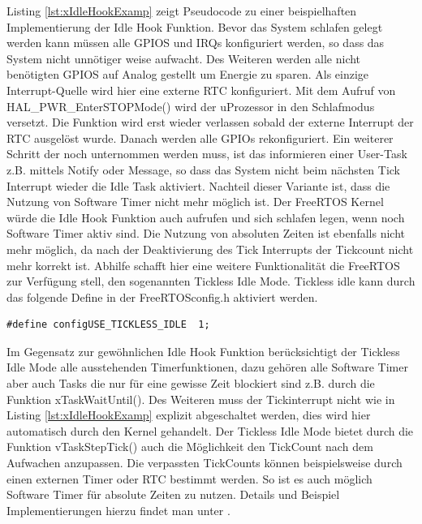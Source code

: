 Listing \ref{lst:xIdleHookExamp} zeigt Pseudocode zu einer beispielhaften Implementierung der Idle Hook Funktion. Bevor das System schlafen gelegt werden kann müssen alle GPIOS und IRQs konfiguriert werden, so dass das System nicht unnötiger weise aufwacht. Des Weiteren werden alle nicht benötigten GPIOS auf Analog gestellt um Energie zu sparen. Als einzige Interrupt-Quelle wird hier eine externe RTC konfiguriert. Mit dem Aufruf von HAL\_PWR\_EnterSTOPMode() wird der uProzessor in den Schlafmodus versetzt. Die Funktion wird erst wieder verlassen sobald der externe Interrupt der RTC ausgelöst wurde. Danach werden alle GPIOs rekonfiguriert. Ein weiterer Schritt der noch unternommen werden muss, ist das informieren einer User-Task z.B. mittels Notify oder Message, so dass das System nicht beim nächsten Tick Interrupt wieder die Idle Task aktiviert. Nachteil dieser Variante ist, dass die Nutzung von Software Timer nicht mehr möglich ist. Der FreeRTOS Kernel würde die Idle Hook Funktion auch aufrufen und sich schlafen legen, wenn noch Software Timer aktiv sind. Die Nutzung von absoluten Zeiten ist ebenfalls nicht mehr möglich, da nach der Deaktivierung des Tick Interrupts der Tickcount nicht mehr korrekt ist. Abhilfe schafft hier eine weitere Funktionalität die FreeRTOS zur Verfügung stell, den sogenannten Tickless Idle Mode. Tickless idle kann durch das folgende Define in der FreeRTOSconfig.h aktiviert werden.  
\begin{lstlisting}[label=lst:defineTicklessIdle, numbers = none]
#define configUSE_TICKLESS_IDLE  1; 
\end{lstlisting}
Im Gegensatz zur gewöhnlichen Idle Hook Funktion be\-rück\-sich\-tigt der Tickless Idle Mode alle ausstehenden Timerfunktionen, dazu gehören alle Software Timer aber auch Tasks die nur für eine gewisse Zeit blockiert sind z.B. durch die Funktion xTaskWaitUntil(). Des Weiteren muss der Tickinterrupt nicht wie in Listing \ref{lst:xIdleHookExamp} explizit abgeschaltet werden, dies wird hier automatisch durch den Kernel gehandelt. Der Tickless Idle Mode bietet durch die Funktion vTaskStepTick() auch die Möglichkeit den TickCount nach dem Aufwachen anzupassen. Die verpassten TickCounts können beispielsweise durch einen externen Timer oder RTC bestimmt werden. So ist es auch möglich Software Timer für absolute Zeiten zu nutzen. Details und Beispiel Implementierungen hierzu findet man unter \cite{FreeRtosAdvanced}.  

